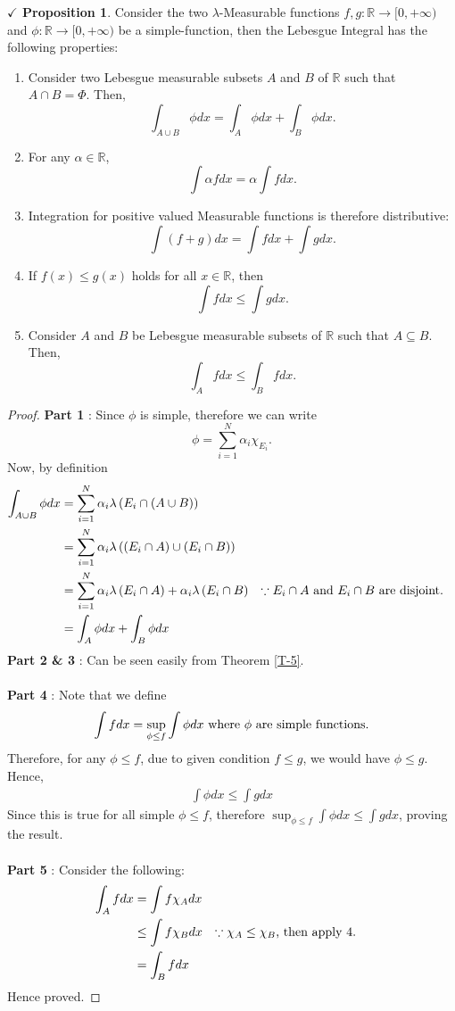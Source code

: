 \documentclass{article}
\theoremstyle{definition}
\theoremstyle{remark}
\theoremstyle{definition}
\theoremstyle{definition}
\newtheorem{proposition}{$\checkmark$ Proposition}
\theoremstyle{definition}
\newcommand{\union}{\cup}
\newcommand{\intrs}{\cap}
\newcommand{\R}{\mathbb{R}}
\newcommand{\lm}[1]{\lambda\left (#1\right )}
\begin{document}
\begin{proposition}\label{P-33}
	Consider the two $ \lambda $-Measurable functions $ f,g : \R \to [0,+\infty) $ and $ \phi: \R \to [0,+\infty) $ be a simple-function, then the Lebesgue Integral has the following properties:
	\begin{enumerate}
		\item {Consider two Lebesgue measurable subsets $ A $ and $ B $ of $ \R $ such that $ A\intrs B = \Phi $. Then,
	\[\int_{A\union B}\phi dx = \int_A \phi dx + \int_B \phi dx.\]	
	}
		\item {For any $ \alpha \in \R $,
	\[\int \alpha fdx = \alpha \int fdx.\]	
	}
\item {Integration for positive valued Measurable functions is therefore distributive:
\[\int (f+g)dx = \int fdx + \int gdx.\]
}
\item {If $ f(x) \le g(x) $ holds for all $ x\in \R $, then 
\[\int fdx \le \int gdx.\]
}
\item {Consider $ A $ and $ B $ be Lebesgue measurable subsets of $ \R $ such that $ A\subseteq B $. Then,
\[\int_A f dx \le \int_B fdx.\]
}
	\end{enumerate}
\end{proposition}
\begin{proof}
	\textbf{Part 1} : Since $ \phi $ is simple, therefore we can write
	\[\phi = \sum_{i=1}^N \alpha_i \chi_{E_i}.\]
	Now, by definition
	\begin{align*}
		\int_{A\union B} \phi dx &= \sum_{i=1}^{N} \alpha_i \lm{E_i \intrs (A\union B)}\\
		&= \sum_{i=1}^{N} \alpha_i \lm{(E_i \intrs A) \union (E_i \intrs B)}\\
		&= \sum_{i=1}^{N} \alpha_{i} \lm{E_i \intrs A} + \alpha_i \lm{E_i \intrs B} &&\text{$ \because E_i\intrs A$ and $ E_i \intrs B $ are disjoint.}\\
		&= \int_{A} \phi dx + \int_{B} \phi dx
	\end{align*}
\textbf{Part 2 \& 3} : Can be seen easily from Theorem \ref{T-5}.\\\\
\textbf{Part 4} : Note that we define
\[\int fdx = \sup_{\phi \le f} \int \phi dx\text{ where $ \phi $ are simple functions.}\]
Therefore, for any $ \phi \le f $, due to given condition $ f\le g $, we would have $ \phi \le g $. Hence,
\begin{align*}
	\int \phi dx \le \int g dx 
\end{align*}
Since this is true for all simple $ \phi \le f $, therefore $ \sup_{\phi \le f} \int \phi dx \le \int gdx $, proving the result.\\\\
\textbf{Part 5} : Consider the following:
\begin{align*}
	\int_{A} f dx &= \int f\chi_{A} dx\\
	&\le \int f\chi_{B} dx &&\text{$ \because \chi_{A} \le \chi_{B}$, then apply 4.}\\
	&= \int_{B} f dx
\end{align*}
Hence proved.
\end{proof}
\end{document}
